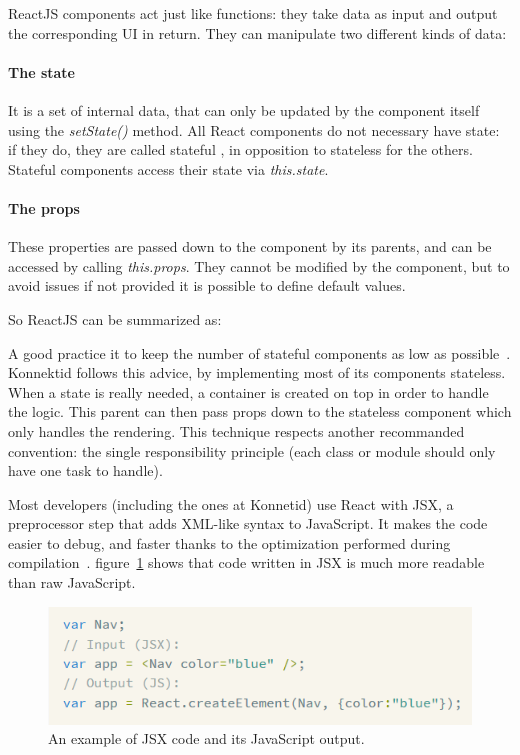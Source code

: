ReactJS components act just like functions: they take data as input and output the corresponding UI in return. They can manipulate two different kinds of data:
\paragraph{The state} It is a set of internal data, that can only be updated by the component itself using the \textit{setState()}  method. All React components do not necessary have state: if they do, they are called \guillemotleft{} stateful \guillemotright{}, in opposition to \guillemotleft{} stateless \guillemotright{} for the others. Stateful components access their state via \textit{this.state}.

\paragraph{The props} These properties are passed down to the component by its parents, and can be accessed by calling \textit{this.props}. They cannot be modified by the component, but to avoid issues if not provided it is possible to define default values.

So ReactJS can be summarized as: 

A good practice it to keep the number of stateful components as low as possible~\cite{state}. Konnektid follows this advice, 
by implementing most of its components stateless. When a state is really needed, a \guillemotleft{} container \guillemotright{} 
is created on top in order to handle the logic. This parent can then pass props down to the stateless component which only handles the rendering. This technique respects another recommanded convention: the single responsibility principle (each class or module should only have one task to handle). 

Most developers (including the ones at Konnetid) use React with JSX, a preprocessor step that adds XML-like syntax to JavaScript.
It makes the code easier to debug, and faster thanks to the optimization performed during compilation~\cite{whyJsx}. {\sc figure}~\ref{fig:jsx} shows that code written in JSX is much more readable than raw JavaScript.

\begin{figure}[H]
    \centering
    \includegraphics[scale=0.9]{figure/jsx.png}
    \caption{An example of JSX code and its JavaScript output.}
    \label{fig:jsx}
\end{figure}

